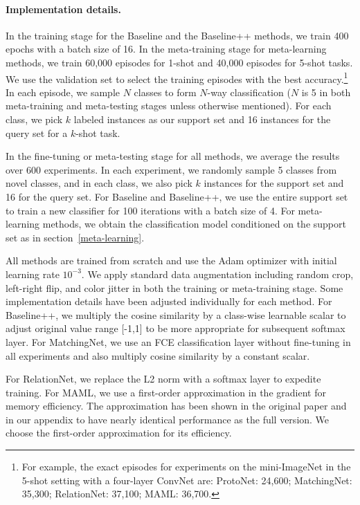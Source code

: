 \paragraph{Implementation details.} In the training stage for the Baseline and the Baseline++ methods, we train 400 epochs with a batch size of 16. In the meta-training stage for meta-learning methods, we train 60,000 episodes for 1-shot and 40,000 episodes for 5-shot tasks. We use the validation set to select the training episodes with the best accuracy.\footnote{For example, the exact episodes for experiments on the mini-ImageNet in the 5-shot setting with a four-layer ConvNet are: ProtoNet: 24,600; MatchingNet: 35,300; RelationNet: 37,100; MAML: 36,700.}  In each episode, we sample $N$ classes to form $N$-way classification ($N$ is 5 in both meta-training and meta-testing stages unless otherwise mentioned). For each class, we pick $k$ labeled instances as our support set and 16 instances for the query set for a $k$-shot task.

In the fine-tuning or meta-testing stage for all methods, we average the results over 600 experiments. In each experiment, we randomly sample 5 classes from novel classes, and in each class, we also pick $k$ instances for the support set and 16 for the query set. For Baseline and Baseline++, we use the entire support set to train a new classifier for 100 iterations with a batch size of 4. For meta-learning methods, we obtain the classification model conditioned on the support set as in section~\ref{meta-learning}.

All methods are trained from scratch and use the Adam optimizer with initial learning rate $10^{-3}$. We apply standard data augmentation including random crop, left-right flip, and color jitter in both the training or meta-training stage. Some implementation details have been adjusted individually for each method. For Baseline++, we multiply the cosine similarity by a class-wise learnable scalar to adjust original value range [-1,1] to be more appropriate for subsequent softmax layer. For MatchingNet, we use an FCE classification layer without fine-tuning in all experiments and also multiply cosine similarity by a constant scalar.

For RelationNet, we replace the L2 norm with a softmax layer to expedite training. For MAML, we use a first-order approximation in the gradient for memory efficiency. The approximation has been shown in the original paper and in our appendix to have nearly identical  performance as the full version. We choose the first-order approximation for its efficiency. 

